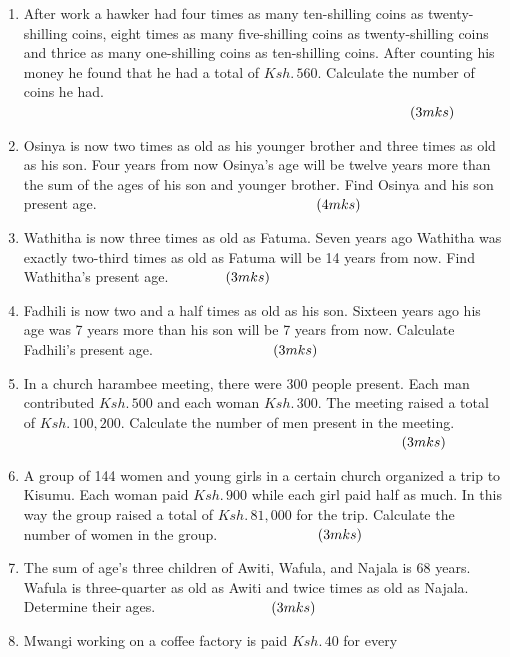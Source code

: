 \documentclass[
  letterpaper,
  DIV=11,
  numbers=noendperiod]{scrreprt}
\begin{document}
\begin{tcolorbox}
\begin{enumerate}
\def\labelenumi{\arabic{enumi}.}
\setcounter{enumi}{11}
\item
  After work a hawker had four times as many ten-shilling coins as
  twenty-shilling coins, eight times as many five-shilling coins as
  twenty-shilling coins and thrice as many one-shilling coins as
  ten-shilling coins. After counting his money he found that he had a
  total of \(Ksh.\, 560\). Calculate the number of coins he had.
  \(\hspace{9.7cm} (3mks)\)
\item
  Osinya is now two times as old as his younger brother and three times
  as old as his son. Four years from now Osinya's age will be twelve
  years more than the sum of the ages of his son and younger brother.
  Find Osinya and his son present age.\(\hspace{5.5cm} (4mks)\)
\item
  Wathitha is now three times as old as Fatuma. Seven years ago Wathitha
  was exactly two-third times as old as Fatuma will be 14 years from
  now. Find Wathitha's present age. \(\hspace{1.3cm}(3mks)\)
\item
  Fadhili is now two and a half times as old as his son. Sixteen years
  ago his age was 7 years more than his son will be 7 years from now.
  Calculate Fadhili's present age. \(\hspace{2.9cm} (3mks)\)
\item
  In a church harambee meeting, there were 300 people present. Each man
  contributed \(Ksh. \,500\) and each woman \(Ksh.\, 300\). The meeting
  raised a total of \(Ksh.\, 100,200\). Calculate the number of men
  present in the meeting. \(\hspace{9.5cm} (3mks)\)
\item
  A group of 144 women and young girls in a certain church organized a
  trip to Kisumu. Each woman paid \(Ksh. \,900\) while each girl paid
  half as much. In this way the group raised a total of
  \(Ksh.\, 81,000\) for the trip. Calculate the number of women in the
  group. \(\hspace{2.4cm} (3mks)\)
\item
  The sum of age's three children of Awiti, Wafula, and Najala is 68
  years. Wafula is three-quarter as old as Awiti and twice times as old
  as Najala. Determine their ages. \(\hspace{2.8cm} (3mks)\)
\item
  Mwangi working on a coffee factory is paid \(Ksh.\, 40\) for every

\end{enumerate}
\end{tcolorbox}
\end{document}
